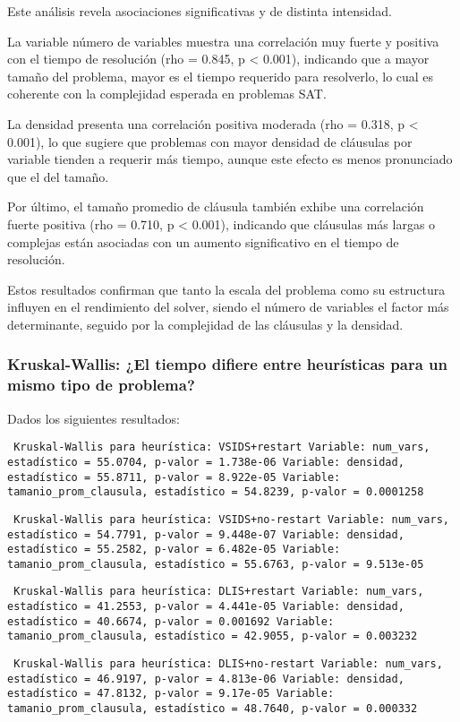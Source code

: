 Este an\'alisis revela asociaciones significativas y de distinta intensidad.

La variable número de variables muestra una correlación muy fuerte y positiva con el tiempo de resolución (rho = 0.845, p < 0.001), indicando que a mayor tamaño del problema, mayor es el tiempo requerido para resolverlo, lo cual es coherente con la complejidad esperada en problemas SAT.

La densidad presenta una correlación positiva moderada (rho = 0.318, p < 0.001), lo que sugiere que problemas con mayor densidad de cláusulas por variable tienden a requerir más tiempo, aunque este efecto es menos pronunciado que el del tamaño.

Por último, el tamaño promedio de cláusula también exhibe una correlación fuerte positiva (rho = 0.710, p < 0.001), indicando que cláusulas más largas o complejas están asociadas con un aumento significativo en el tiempo de resolución.

Estos resultados confirman que tanto la escala del problema como su estructura influyen en el rendimiento del solver, siendo el número de variables el factor más determinante, seguido por la complejidad de las cláusulas y la densidad. 

\subsubsection{Kruskal-Wallis: ¿El tiempo difiere entre heurísticas para un mismo tipo de problema?}

Dados los siguientes resultados:

\texttt{
Kruskal-Wallis para heurística: VSIDS+restart
Variable: num\_vars, estadístico = 55.0704, p-valor = 1.738e-06
Variable: densidad, estadístico = 55.8711, p-valor = 8.922e-05
Variable: tamanio\_prom\_clausula, estadístico = 54.8239, p-valor = 0.0001258}

\texttt{
Kruskal-Wallis para heurística: VSIDS+no-restart
Variable: num\_vars, estadístico = 54.7791, p-valor = 9.448e-07
Variable: densidad, estadístico = 55.2582, p-valor = 6.482e-05
Variable: tamanio\_prom\_clausula, estadístico = 55.6763, p-valor = 9.513e-05}

\texttt{
Kruskal-Wallis para heurística: DLIS+restart
Variable: num\_vars, estadístico = 41.2553, p-valor = 4.441e-05
Variable: densidad, estadístico = 40.6674, p-valor = 0.001692
Variable: tamanio\_prom\_clausula, estadístico = 42.9055, p-valor = 0.003232}

\texttt{
Kruskal-Wallis para heurística: DLIS+no-restart
Variable: num\_vars, estadístico = 46.9197, p-valor = 4.813e-06
Variable: densidad, estadístico = 47.8132, p-valor = 9.17e-05
Variable: tamanio\_prom\_clausula, estadístico = 48.7640, p-valor = 0.000332}

